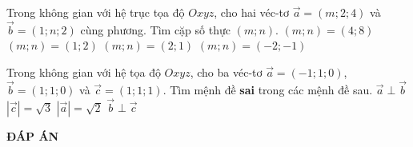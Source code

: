 \begin{ex}%
Trong không gian với hệ trục tọa độ $Oxyz$, cho hai véc-tơ $\overrightarrow{a}=(m;2;4)$ và $\overrightarrow{b}=(1;n;2)$ cùng phương. Tìm cặp số thực $(m;n)$.
\choice
{$(m;n)=(4;8)$}
{$(m;n)=(1;2)$}
{\True $(m;n)=(2;1)$}
{$(m;n)=(-2;-1)$}
\end{ex}

\begin{ex}%
Trong không gian với hệ tọa độ $Oxyz$, cho ba véc-tơ $\overrightarrow{a}=(-1;1;0)$, $\overrightarrow{b}=(1;1;0)$ và $\overrightarrow{c}=(1;1;1)$. Tìm mệnh đề \textbf{sai} trong các mệnh đề sau.
\choice
{$\overrightarrow{a}\perp\overrightarrow{b}$}
{$\left|\overrightarrow{c}\right|=\sqrt{3}$}
{$\left|\overrightarrow{a}\right|=\sqrt{2}$}
{\True $\overrightarrow{b}\perp\overrightarrow{c}$}
\end{ex}



\newpage
\begin{center}
	\textbf{ĐÁP ÁN}
\end{center}
\begin{multicols}{10}
	 
\end{multicols}


